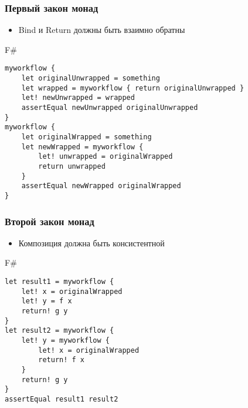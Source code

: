 \documentclass[xetex,mathserif,serif]{beamer}
\begin{document}
	\begin{frame}[fragile]
		\frametitle{Первый закон монад}
		\begin{itemize}
			\item Bind и Return должны быть взаимно обратны
		\end{itemize}
		\begin{footnotesize}
			\begin{exampleblock}{F\#}
				\begin{verbatim}
myworkflow {
    let originalUnwrapped = something
    let wrapped = myworkflow { return originalUnwrapped }
    let! newUnwrapped = wrapped
    assertEqual newUnwrapped originalUnwrapped 
}
myworkflow {
    let originalWrapped = something
    let newWrapped = myworkflow { 
        let! unwrapped = originalWrapped
        return unwrapped
    }
    assertEqual newWrapped originalWrapped
}
				\end{verbatim}
			\end{exampleblock}
		\end{footnotesize}
\end{frame}

	\begin{frame}[fragile]
		\frametitle{Второй закон монад}
		\begin{itemize}
			\item Композиция должна быть консистентной
		\end{itemize}
		\begin{exampleblock}{F\#}
			\begin{verbatim}
let result1 = myworkflow { 
    let! x = originalWrapped
    let! y = f x 
    return! g y  
}
let result2 = myworkflow { 
    let! y = myworkflow { 
        let! x = originalWrapped
        return! f x
    }
    return! g y
}
assertEqual result1 result2
			\end{verbatim}
		\end{exampleblock}
\end{frame}
\end{document}
